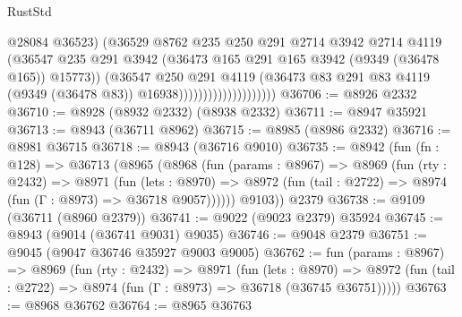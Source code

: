 \begin{lexlean}{RustStd}
\begin{coremodule}
                                        @28084
                                        @36523)
                                      (@36529
                                        @8762
                                        @235
                                        @250
                                        @291
                                        @2714
                                        @3942
                                        @2714
                                        @4119
                                        (@36547
                                          @235
                                          @291
                                          @3942
                                          (@36473
                                            @165
                                            @291
                                            @165
                                            @3942
                                            (@9349 (@36478 @165))
                                            @15773))
                                        (@36547
                                          @250
                                          @291
                                          @4119
                                          (@36473
                                            @83
                                            @291
                                            @83
                                            @4119
                                            (@9349 (@36478 @83))
                                            @16938))))))))))))))))))))
@36706 := @8926 @2332
@36710 := @8928 (@8932 @2332) (@8938 @2332)
@36711 := @8947 @35921
@36713 := @8943 (@36711 @8962)
@36715 := @8985 (@8986 @2332)
@36716 := @8981 @36715
@36718 := @8943 (@36716 @9010)
@36735 := @8942
    (fun (fn : @128) =>
    @36713
      (@8965
        (@8968
          (fun (params : @8967) =>
          @8969
            (fun (rty : @2432) =>
            @8971
              (fun (lets : @8970) =>
              @8972 (fun (tail : @2722) => @8974 (fun (Γ : @8973) => @36718 @9057))))))
        @9103))
    @2379
@36738 := @9109 (@36711 (@8960 @2379))
@36741 := @9022 (@9023 @2379) @35924
@36745 := @8943 (@9014 (@36741 @9031) @9035)
@36746 := @9048 @2379
@36751 := @9045 (@9047 @36746 @35927 @9003 @9005)
@36762 := fun (params : @8967) =>
  @8969
    (fun (rty : @2432) =>
    @8971
      (fun (lets : @8970) =>
      @8972 (fun (tail : @2722) => @8974 (fun (Γ : @8973) => @36718 (@36745 @36751)))))
@36763 := @8968 @36762
@36764 := @8965 @36763

\end{coremodule}
\end{lexlean}
